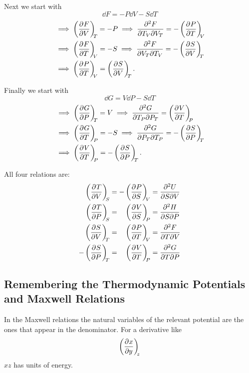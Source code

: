 \documentclass[a4paper]{article}
\begin{document}
    Next we start with
    \[\dd{F} = -P\dd{V} - S\dd{T}\]
    \begin{align*}
        &\implies \pdvconst{F}{V}{T} = -P \implies \pdvsec{F}{T_V}{V_T} = -\pdvconst{P}{T}{V}\\
        &\implies \pdvconst{F}{T}{V} = -S \implies \pdvsec{F}{V_T}{T_V} = -\pdvconst{S}{V}{T}\\
        &\implies \pdvconst{P}{T}{V} = \pdvconst{S}{V}{T}.
    \end{align*}

    Finally we start with
    \[\dd{G} = V\dd{P} - S\dd{T}\]
    \begin{align*}
        &\implies \pdvconst{G}{P}{T} = V \implies \pdvsec{G}{T_P}{P_T} = \pdvconst{V}{T}{P}\\
        &\implies \pdvconst{G}{T}{P} = -S \implies \pdvsec{G}{P_T}{T_P} = -\pdvconst{S}{P}{T}\\
        &\implies \pdvconst{V}{T}{P} = -\pdvconst{S}{P}{T}.
    \end{align*}
    
    All four relations are:
    \begin{align*}
        \hphantom{-}\pdvconst{T}{V}{S} &= -\pdvconst{P}{S}{V} = \pdvsec{U}{S}{V} \\
        \hphantom{-}\pdvconst{T}{P}{S} &= \hphantom{-}\pdvconst{V}{S}{P} = \pdvsec{H}{S}{P} \\
        \hphantom{-}\pdvconst{S}{V}{T} &= \hphantom{-}\pdvconst{P}{T}{V} = \pdvsec{F}{T}{V} \\
        -\pdvconst{S}{P}{T} &= \hphantom{-}\pdvconst{V}{T}{P} = \pdvsec{G}{T}{P} \\
    \end{align*}
    
    \subsection{Remembering the Thermodynamic Potentials and Maxwell Relations}
    In the Maxwell relations the natural variables of the relevant potential are the ones that appear in the denominator.
    For a derivative like
    \[\left(\pdv[]{x}{y}\right)_{\!\!{z}}\]
    \(xz\) has units of energy.
    
\end{document}
